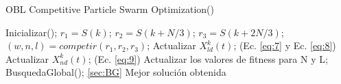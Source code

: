 \begin{algorithm}[]
  \caption{OBL Competitive Particle Swarm Optimization(\mbox{})}
  \label{pseu:oblcpso}
  \begin{algorithmic}[1]
    \STATE Inicializar();
        \STATE $ r_{1} = S(k)$;
        \STATE $ r_{2} = S(k + N/3)$;
        \STATE $ r_{3} = S(k + 2N/3)$;
        \STATE $(w, n, l) = competir(r_{1}, r_{2}, r_{3})$;
        \STATE Actualizar $ X^{k}_{ld}(t)$; (Ec. \ref{eq:7} y Ec. \ref{eq:8})
        \STATE Actualizar $ X^{k}_{nd}(t)$; (Ec. \ref{eq:9})
        \STATE Actualizar los valores de fitness para N y L;
      \ENDFOR
      \STATE BusquedaGlobal(); \ref{sec:BG}
    \ENDWHILE
    \RETURN Mejor solución obtenida
  \end{algorithmic}
\end{algorithm}